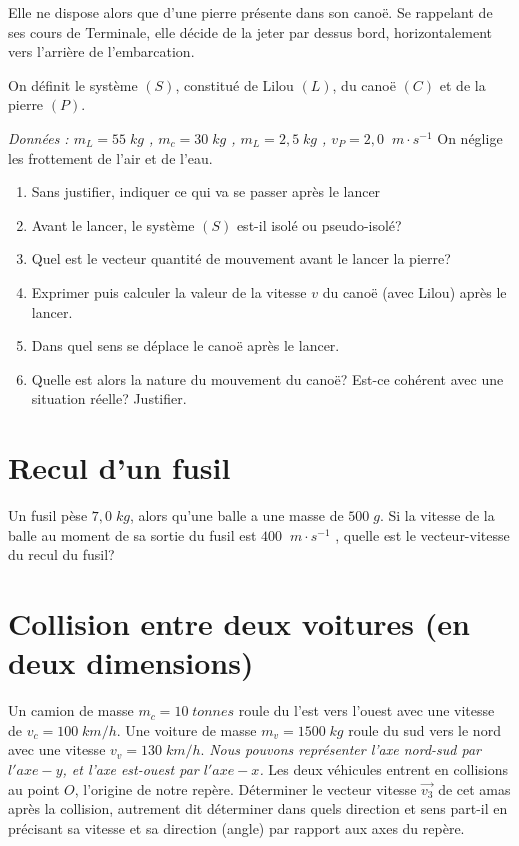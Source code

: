 \documentclass[11pt,a4paper]{article}
\newcommand{\mps}{\; m\cdot s^{-1}}
\begin{document}
Elle ne dispose alors que d’une pierre présente dans son canoë. Se rappelant de ses cours de Terminale, elle décide de la jeter par dessus bord, horizontalement vers l’arrière de l’embarcation.

On définit le système $(S)$, constitué de Lilou $(L)$, du canoë $(C)$ et de la pierre $(P)$. 

\textit{Données : $m_L=55 \; kg$ , $m_c=30 \; kg$ , $m_L=2,5 \; kg$ , $v_P=2,0  \; \mps$}
On néglige les frottement de l'air et de l'eau. 
\begin{enumerate}
    \item Sans justifier, indiquer ce qui va se passer après le lancer
    \item Avant le lancer, le système $(S)$ est-il isolé ou pseudo-isolé?
    \item Quel est le vecteur quantité de mouvement avant le lancer la pierre?
    \item Exprimer puis calculer la valeur de la vitesse $v$ du canoë (avec  Lilou) après le lancer.
    \item Dans quel sens se déplace le canoë après le lancer.
    \item Quelle est alors la nature du mouvement du canoë? Est-ce cohérent avec une situation réelle? Justifier.

\end{enumerate}

\section{Recul d'un fusil}

Un fusil pèse $7,0 \; kg$, alors qu’une balle a une masse de $500 \; g$. Si la vitesse de la balle au moment de sa sortie du fusil est $400 \; \mps$ , quelle est le vecteur-vitesse du recul du fusil? 


\section{Collision entre deux voitures (en deux dimensions)}

Un camion de masse $m_c=10 \; tonnes$ roule du l'est vers l'ouest avec une vitesse de $v_c=100 \; km/h$. 
Une voiture de masse $m_v=1500 \; kg$ roule du sud vers le nord avec une vitesse $v_v=130\; km/h$. 
\textit{Nous pouvons représenter l'axe nord-sud par $l'axe-y$, et l'axe est-ouest par $l'axe-x$.}
Les deux véhicules entrent en collisions au point $O$, l'origine de notre repère. 
Déterminer le vecteur vitesse $\vec{v_3}$ de cet amas après la collision, autrement dit déterminer dans quels direction et sens part-il en précisant sa vitesse et sa direction (angle) par rapport aux axes du repère. 
\end{document}
